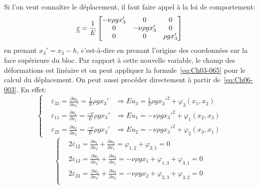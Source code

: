 Si l'on veut connaître le déplacement, il faut faire appel à la loi de comportement:
\begin{equation}
    \underline{\underline{\varepsilon}} = \frac{1}{E} 
    \begin{bmatrix}
        -\nu \rho g x_3' & 0 & 0 \\
        0 & -\nu \rho g x_3' & 0 \\
        0 & 0 & \rho g x_3'
    \end{bmatrix}
    \label{eq:Ch06-037}
\end{equation}
en prenant $x_3'= x_3 -h$, c'est-à-dire en prenant l'origine des coordonnées sur la face supérieure du bloc.
Par rapport à cette nouvelle variable, le champ des déformations est linéaire et on peut appliquer la formule~\eqref{eq:Ch03-065} pour le calcul du déplacement. On peut aussi procéder directement à partir de~\eqref{eq:Ch06-003}.
En effet:
\begin{equation}
    \left\{
    \begin{aligned}
        & \varepsilon_{33} = \frac{\partial u_3}{\partial x_3'} = \frac{1}{E} \rho g x_3' &\Rightarrow E u_3 = \frac{1}{2}\rho g x_3'^2 + \varphi_3 \left( x_1, x_2 \right) \\
        & \varepsilon_{11} = \frac{\partial u_1}{\partial x_1} = \frac{-\nu}{E} \rho g x_3' &\Rightarrow E u_1 = -\nu\rho g x_3'^2 + \varphi_1 \left( x_2, x_3 \right) \\
        & \varepsilon_{22} = \frac{\partial u_2}{\partial x_2} = \frac{-\nu}{E} \rho g x_3' &\Rightarrow E u_2 = -\nu\rho g x_3'^2 + \varphi_2 \left( x_3, x_1 \right)
    \end{aligned}
    \right.
    \label{eq:Ch06-038}
\end{equation}
\begin{equation}
    \left\{
    \begin{aligned}
        & 2\varepsilon_{12} = \frac{\partial u_1}{\partial x_2} + \frac{\partial u_2}{\partial x_1} = \varphi_{1,2} + \varphi_{2,1} = 0 \\
        & 2\varepsilon_{13} = \frac{\partial u_1}{\partial x_3'} + \frac{\partial u_3}{\partial x_1} = -\nu \rho g x_1 + \varphi_{1,3} + \varphi_{3,1} = 0 \\
        & 2\varepsilon_{23} = \frac{\partial u_2}{\partial x_3'} + \frac{\partial u_3}{\partial x_2} = -\nu \rho g x_2 + \varphi_{2,3} + \varphi_{3,2} = 0 \\
    \end{aligned}
    \right.
    \label{eq:Ch06-039}
\end{equation}
